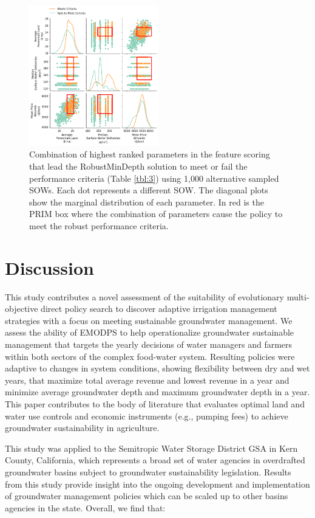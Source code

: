 \documentclass[a4paper,fleqn]{cas-sc}
\begin{document}
\begin{figure}[htb!]
    \includegraphics[width=0.5\textwidth,center]{./figs/prim_robust_mindepth.png}
    \caption{Combination of highest ranked parameters in the feature scoring that lead the RobustMinDepth solution to meet or fail the performance criteria (Table \ref{tbl:3}) using 1,000 alternative sampled SOWs. Each dot represents a different SOW. The diagonal plots show the marginal distribution of each parameter. In red is the PRIM box where the combination of parameters cause the policy to meet the robust performance criteria.} \label{fig:9}
\end{figure}

\clearpage
\section{Discussion}

This study contributes a novel assessment of the suitability of evolutionary multi-objective direct policy search to discover adaptive irrigation management strategies with a focus on meeting sustainable groundwater management. We assess the ability of EMODPS to help operationalize groundwater sustainable management that targets the yearly decisions of water managers and farmers within both sectors of the complex food-water system. Resulting policies were adaptive to changes in system conditions, showing flexibility between dry and wet years, that maximize total average revenue and lowest revenue in a year and minimize average groundwater depth and maximum groundwater depth in a year. This paper contributes to the body of literature that evaluates optimal land and water use controls and economic instruments (e.g., pumping fees) to achieve groundwater sustainability in agriculture. 

This study was applied to the Semitropic Water Storage District GSA in Kern County, California, which represents a broad set of water agencies in overdrafted groundwater basins subject to groundwater sustainability legislation. Results from this study provide insight into the ongoing development and implementation of groundwater management policies which can be scaled up to other basins agencies in the state. Overall, we find that:  
\end{document}
